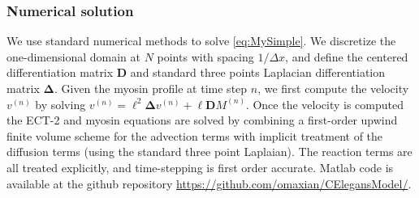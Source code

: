 \documentclass[11pt]{article}
\newcommand{\M}[1]{\boldsymbol{#1}}
\begin{document}
\begin{appendix}
\subsubsection{Numerical solution}
We use standard numerical methods to solve \eqref{eq:MySimple}. We discretize the one-dimensional domain at $N$ points with spacing $1/\Delta x$, and define the centered differentiation matrix $\M{D}$ and standard three points Laplacian differentiation matrix $\M{\Delta}$. Given the myosin profile at time step $n$, we first compute the velocity $v^{(n)}$ by solving $v^{(n)} = \ell^2 \M{\Delta} v^{(n)} + \ell \M{D} M^{(n)}$. Once the velocity is computed the ECT-2 and myosin equations are solved by combining a first-order upwind finite volume scheme for the advection terms \citep[Sec.~1.4]{hundsdorfer2003numerical} with implicit treatment of the diffusion terms (using the standard three point Laplaian). The reaction terms are all treated explicitly, and time-stepping is first order accurate. Matlab code  is available at the github repository \url{https://github.com/omaxian/CElegansModel/}.



\end{appendix}
\end{document}
